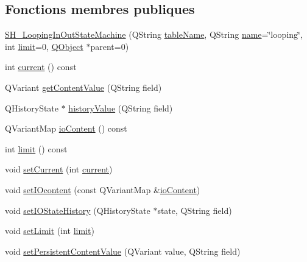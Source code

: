 \subsection*{Fonctions membres publiques}
\begin{DoxyCompactItemize}
\item 
\hyperlink{classSH__LoopingInOutStateMachine_ab183e4ef00fa1297e942b3a4d78b3523}{S\-H\-\_\-\-Looping\-In\-Out\-State\-Machine} (Q\-String \hyperlink{classSH__InOutStateMachine_a4288a6c86ddf83effefff886675591c9}{table\-Name}, Q\-String \hyperlink{classSH__NamedObject_a9f686c6f2a5bcc08ad03d0cee0151f0f}{name}=\char`\"{}looping\char`\"{}, int \hyperlink{classSH__LoopingInOutStateMachine_a7b61682544bd06b52020df3e0d801d21}{limit}=0, \hyperlink{classQObject}{Q\-Object} $\ast$parent=0)
\item 
int \hyperlink{classSH__LoopingInOutStateMachine_afce58401195a4941b1939c46f1caa23b}{current} () const 
\item 
Q\-Variant \hyperlink{classSH__InOutStateMachine_aa1a3bd3c0ea8a59b9bc916dc718eb9ca}{get\-Content\-Value} (Q\-String field)
\item 
Q\-History\-State $\ast$ \hyperlink{classSH__InOutStateMachine_af71bfdb3b59b7bf2763588b513b4205f}{history\-Value} (Q\-String field)
\item 
Q\-Variant\-Map \hyperlink{classSH__InOutStateMachine_aaca105fbd5f5cc3bac115389ad3694c5}{io\-Content} () const 
\item 
int \hyperlink{classSH__LoopingInOutStateMachine_aa82afb8de3acbd0953bdf468f697d777}{limit} () const 
\item 
void \hyperlink{classSH__LoopingInOutStateMachine_aed2f3a75029856cbf28cae78040e17c1}{set\-Current} (int \hyperlink{classSH__LoopingInOutStateMachine_afce58401195a4941b1939c46f1caa23b}{current})
\item 
void \hyperlink{classSH__InOutStateMachine_a8271a7ec7d5f6502449dd3b4da5f4155}{set\-I\-Ocontent} (const Q\-Variant\-Map \&\hyperlink{classSH__InOutStateMachine_aaca105fbd5f5cc3bac115389ad3694c5}{io\-Content})
\item 
void \hyperlink{classSH__InOutStateMachine_acbcce2c4300af1634d928b30e5e9be1c}{set\-I\-O\-State\-History} (Q\-History\-State $\ast$state, Q\-String field)
\item 
void \hyperlink{classSH__LoopingInOutStateMachine_a6dbf2fbcc6524bba5a70baadb8d61be4}{set\-Limit} (int \hyperlink{classSH__LoopingInOutStateMachine_a7b61682544bd06b52020df3e0d801d21}{limit})
\item 
void \hyperlink{classSH__LoopingInOutStateMachine_a99686121d80e3de4c64bebb1d5890ac0}{set\-Persistent\-Content\-Value} (Q\-Variant value, Q\-String field)

\end{DoxyCompactItemize}
